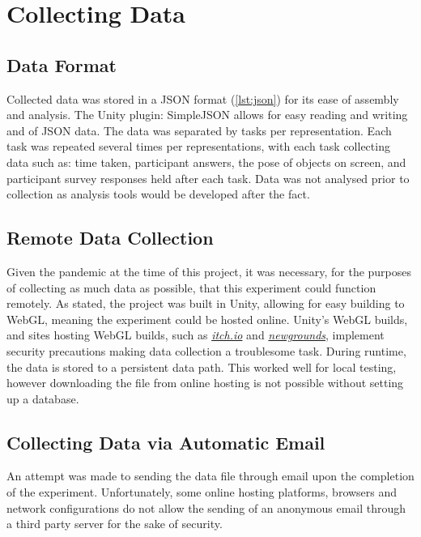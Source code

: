 \documentclass{l4proj}
\begin{document}
\section{Collecting Data}

\subsection*{Data Format}

Collected data was stored in a JSON format (\cref{lst:json}) for its ease of assembly and analysis. The Unity plugin: SimpleJSON \citep{bunny83_simplejson_nodate} allows for easy reading and writing and of JSON data.
The data was separated by tasks per representation. Each task was repeated several times per representations, with each task collecting data such as: time taken, participant answers, the pose of objects on screen, and participant survey responses held after each task. Data was not analysed prior to collection as analysis tools would be developed after the fact.

\subsection{Remote Data Collection}

Given the pandemic at the time of this project, it was necessary, for the purposes of collecting as much data as possible, that this experiment could function remotely. As stated, the project was built in Unity, allowing for easy building to WebGL, meaning the experiment could be hosted online. Unity's WebGL builds, and sites hosting WebGL builds, such as \href{https://itch.io/}{\textit{itch.io}} and \href{https://www.newgrounds.com/}{\textit{newgrounds}}, implement security precautions making data collection a troublesome task.
During runtime, the data is stored to a persistent data path. This worked well for local testing, however downloading the file from online hosting is not possible without setting up a database.

\subsection*{Collecting Data via Automatic Email}

An attempt was made to sending the data file through email upon the completion of the experiment. Unfortunately, some online hosting platforms, browsers and network configurations do not allow the sending of an anonymous email through a third party server for the sake of security. 
\end{document}
